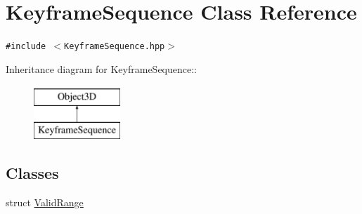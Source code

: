 \hypertarget{classm3g_1_1KeyframeSequence}{
\section{KeyframeSequence Class Reference}
\label{classm3g_1_1KeyframeSequence}
}
{\tt \#include $<$KeyframeSequence.hpp$>$}

Inheritance diagram for KeyframeSequence::\begin{figure}[H]
\begin{center}
\leavevmode
\includegraphics[height=2cm]{classm3g_1_1KeyframeSequence}
\end{center}
\end{figure}
\subsection*{Classes}
\begin{CompactItemize}
\item 
struct \hyperlink{structm3g_1_1KeyframeSequence_1_1ValidRange}{ValidRange}
\end{CompactItemize}
